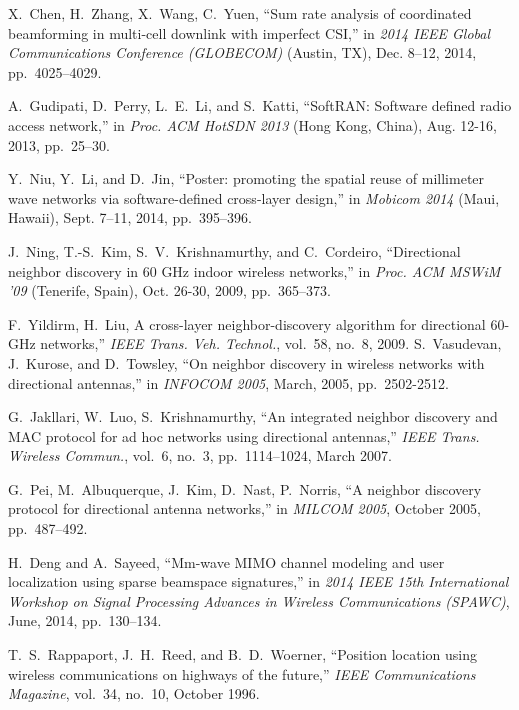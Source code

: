 \documentclass[journal]{IEEEtran}
\begin{document}
\begin{thebibliography}{10}
X.~Chen, H.~Zhang, X.~Wang, C.~Yuen, ``Sum rate analysis of coordinated beamforming in multi-cell downlink with imperfect CSI,'' in \emph{2014 IEEE Global Communications Conference (GLOBECOM)} (Austin, TX), Dec. 8--12, 2014, pp.~4025--4029.



 A.~Gudipati, D.~Perry, L.~E.~Li, and S.~Katti, ``SoftRAN: Software
 defined radio access network,'' in \emph{Proc. ACM HotSDN 2013} (Hong
 Kong, China), Aug. 12-16, 2013, pp.~25--30.


Y.~Niu, Y.~Li, and D.~Jin, ``Poster: promoting the spatial reuse of millimeter wave networks via software-defined cross-layer design,'' in \emph{Mobicom 2014} (Maui, Hawaii), Sept. 7--11, 2014, pp.~395--396.


 J.~Ning, T.-S.~Kim, S.~V.~Krishnamurthy, and C.~Cordeiro, ``Directional
 neighbor discovery in 60 GHz indoor wireless networks,'' in \emph{Proc.
 ACM MSWiM '09} (Tenerife, Spain), Oct. 26-30, 2009, pp.~365--373.

 F.~Yildirm, H.~Liu, A cross-layer neighbor-discovery algorithm for directional 60-GHz networks,'' \emph{IEEE Trans. Veh. Technol.}, vol.~58, no.~8, 2009.
 S.~Vasudevan, J.~Kurose, and D.~Towsley, ``On neighbor discovery in wireless networks with directional antennas,'' in \emph{INFOCOM 2005}, March, 2005, pp.~2502-2512.

G.~Jakllari, W.~Luo, S.~Krishnamurthy, ``An integrated neighbor discovery and MAC protocol for ad hoc networks using directional antennas,'' \emph{IEEE Trans. Wireless Commun.}, vol.~6, no.~3, pp.~1114--1024, March 2007.

G.~Pei, M.~Albuquerque, J.~Kim, D.~Nast, P.~Norris, ``A neighbor discovery protocol for directional antenna networks,'' in \emph{MILCOM 2005}, October 2005, pp.~487--492.

H.~Deng and A.~Sayeed, ``Mm-wave MIMO channel modeling and user localization using sparse beamspace signatures,'' in \emph{2014 IEEE 15th International Workshop on Signal Processing Advances in Wireless Communications (SPAWC)}, June, 2014, pp.~130--134.


T.~S.~Rappaport, J.~H.~Reed, and B.~D.~Woerner, ``Position location using wireless communications on highways of the future,'' \emph{IEEE Communications Magazine}, vol.~34, no.~10, October 1996.


\end{thebibliography}
\end{document}
